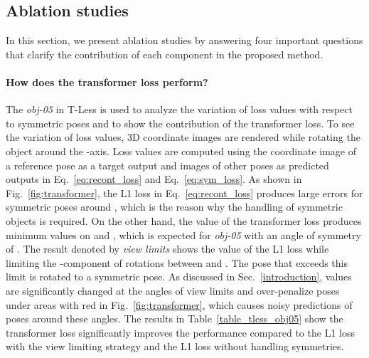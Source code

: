 \documentclass[10pt,twocolumn,letterpaper]{article}
\begin{document}
\subsection{Ablation studies} \label{ablation}
In this section, we present ablation studies by answering four important questions that clarify the contribution of each component in the proposed method.




\paragraph{How does the transformer loss perform?} \label{ablation:transform}
The \textit{obj-05} in T-Less is used to analyze the variation of loss values with respect to symmetric poses and to show the contribution of the transformer loss. To see the variation of loss values, 3D coordinate images are rendered while rotating the object around the -axis. Loss values are computed using the coordinate image of a reference pose as a target output  and images of other poses as predicted outputs  in Eq.~\ref{eq:recont_loss} and Eq.~\ref{eq:sym_loss}. As shown in Fig.~\ref{fig:transformer}, the L1 loss in Eq.~\ref{eq:recont_loss} produces large errors for symmetric poses around , which is the reason why the handling of symmetric objects is required. On the other hand, the value of the transformer loss produces minimum values on  and , which is expected for \textit{obj-05} with an angle of symmetry of . The result denoted by \textit{view limits} shows the value of the L1 loss while limiting the -component of rotations between  and . The pose that exceeds this limit is rotated to a symmetric pose. As discussed in Sec.~\ref{introduction}, values are significantly changed at the angles of view limits and over-penalize poses under areas with red in Fig.~\ref{fig:transformer}, which causes noisy predictions of poses around these angles. The results in Table~\ref{table_tless_obj05} show the transformer loss significantly improves the performance compared to the L1 loss with the view limiting strategy and the L1 loss without handling symmetries. 
\end{document}
